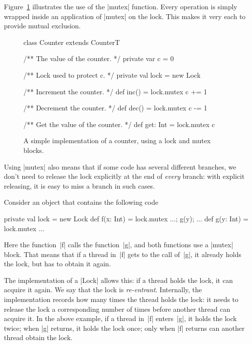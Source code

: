 Figure~\ref{fig:counter-lock} illustrates the use of the |mutex| function.
Every operation is simply wrapped inside an application of |mutex| on the
lock.  This makes it very each to provide mutual exclusion.  


\begin{figure}
\begin{scala}
class Counter extends CounterT{
  /** The value of the counter. */
  private var c = 0

  /** Lock used to protect c. */
  private val lock = new Lock

  /** Increment the counter. */
  def inc() = lock.mutex{ c += 1 }

  /** Decrement the counter. */
  def dec() = lock.mutex{ c -= 1 }

  /** Get the value of the counter. */
  def get: Int = lock.mutex{ c}
}
\end{scala}
\caption{A simple implementation of a counter, using a lock and {\scalashape
    mutex} blocks.}
\label{fig:counter-lock}
\end{figure}


Using |mutex| also means that if some code has several different branches, we
don't need to release the lock explicitly at the end of \emph{every} branch:
with explicit releasing, it is easy to miss a branch in such cases. 



Consider an object that contains the following code
%
\begin{scala}
  private val lock = new Lock
  def f(x: Int) = lock.mutex{ ...; g(y); ... }
  def g(y: Int) = lock.mutex{ ... }
\end{scala}
%
Here the function~|f| calls the function~|g|, and both functions use a |mutex|
block.  That means that if a thread in~|f| gets to the call of~|g|, it already
holds the lock, but has to obtain it again.

The implementation of a |Lock| allows this: if a thread holds the lock, it can
acquire it again.  We say that the lock is \emph{re-entrant}.  Internally, the
implementation records how many times the thread holds the lock: it needs to
release the lock a corresponding number of times before another thread can
acquire it.  In the above example, if a thread in~|f| enters~|g|, it holds the
lock twice; when |g| returns, it holds the lock once; only when |f| returns
can another thread obtain the lock. 

